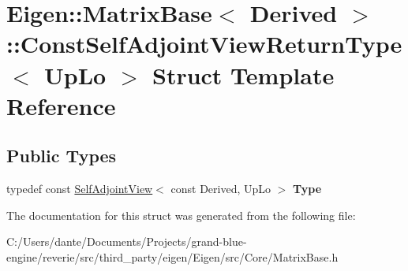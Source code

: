 \hypertarget{struct_eigen_1_1_matrix_base_1_1_const_self_adjoint_view_return_type}{}\section{Eigen\+::Matrix\+Base$<$ Derived $>$\+::Const\+Self\+Adjoint\+View\+Return\+Type$<$ Up\+Lo $>$ Struct Template Reference}
\label{struct_eigen_1_1_matrix_base_1_1_const_self_adjoint_view_return_type}
\subsection*{Public Types}
\begin{DoxyCompactItemize}
\item 
\mbox{\label{struct_eigen_1_1_matrix_base_1_1_const_self_adjoint_view_return_type_ac13928d91344ce53f99519d53299348c}} 
typedef const \mbox{\hyperlink{class_eigen_1_1_self_adjoint_view}{Self\+Adjoint\+View}}$<$ const Derived, Up\+Lo $>$ {\bfseries Type}
\end{DoxyCompactItemize}


The documentation for this struct was generated from the following file\+:\begin{DoxyCompactItemize}
\item 
C\+:/\+Users/dante/\+Documents/\+Projects/grand-\/blue-\/engine/reverie/src/third\+\_\+party/eigen/\+Eigen/src/\+Core/Matrix\+Base.\+h\end{DoxyCompactItemize}
